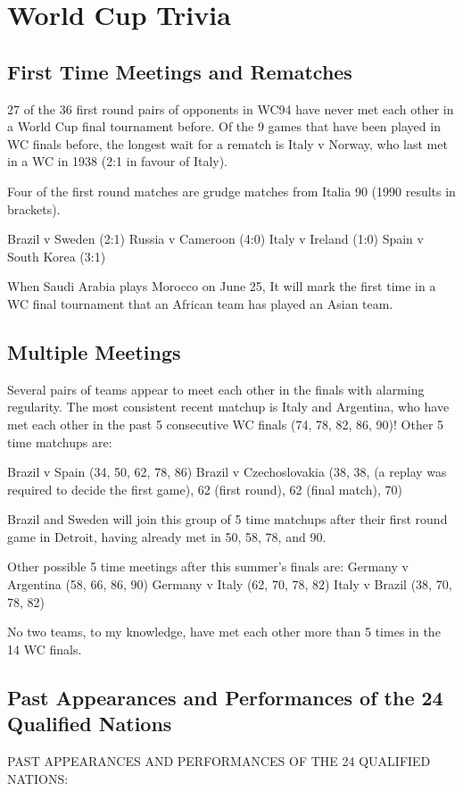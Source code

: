 \chapter{World Cup Trivia}
\section{First Time Meetings and Rematches}

27 of the 36 first round pairs of opponents in WC94 have never met each other 
in a World Cup final tournament before. Of the 9 games that have been played 
in WC finals before, the longest wait for a rematch is Italy v Norway, who last
met in a WC in 1938 (2:1 in favour of Italy).

Four of the first round matches are grudge matches from Italia 90 (1990 results in
brackets).

Brazil v Sweden (2:1)
Russia v Cameroon (4:0)
Italy v Ireland (1:0)
Spain v South Korea (3:1)

When Saudi Arabia plays Morocco on June 25, It will mark the first time in a WC
final tournament that an African team has played an Asian team.

\section{Multiple Meetings}

Several pairs of teams appear to meet each other in the finals with alarming 
regularity. The most consistent recent matchup is Italy and Argentina, who have
met each other in the past 5 consecutive WC finals (74, 78, 82, 86, 90)! 
Other 5 time matchups are:

Brazil v Spain (34, 50, 62, 78, 86)
Brazil v Czechoslovakia (38, 38, (a replay was required to decide the first game), 62 (first round), 62 (final match), 70)

Brazil and Sweden will join this group of 5 time matchups after their first 
round game in Detroit, having already met in 50, 58, 78, and 90.

Other possible 5 time meetings after this summer's finals are:
Germany v Argentina (58, 66, 86, 90)
Germany v Italy (62, 70, 78, 82)
Italy v Brazil (38, 70, 78, 82)

No two teams, to my knowledge, have met each other more than 5 times in the 14
WC finals.

\section{Past Appearances and Performances of the 24 Qualified Nations}
PAST APPEARANCES AND PERFORMANCES OF THE 24 QUALIFIED NATIONS:

